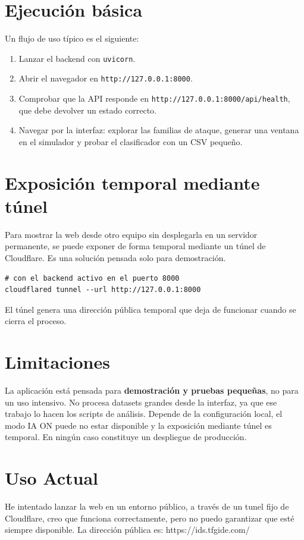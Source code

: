 \section{Ejecución básica}
\label{sec:apb_ejecucion}

Un flujo de uso típico es el siguiente:

\begin{enumerate}
  \item Lanzar el backend con \texttt{uvicorn}.
  \item Abrir el navegador en \texttt{http://127.0.0.1:8000}.
  \item Comprobar que la API responde en \texttt{http://127.0.0.1:8000/api/health}, que debe devolver un estado correcto.
  \item Navegar por la interfaz: explorar las familias de ataque, generar una ventana en el simulador y probar el clasificador con un CSV pequeño.
\end{enumerate}

\section{Exposición temporal mediante túnel}
\label{sec:apb_tunel}

Para mostrar la web desde otro equipo sin desplegarla en un servidor permanente, se puede exponer de forma temporal mediante un túnel de Cloudflare. Es una solución pensada solo para demostración.

\begin{small}
\begin{verbatim}
# con el backend activo en el puerto 8000
cloudflared tunnel --url http://127.0.0.1:8000
\end{verbatim}
\end{small}

El túnel genera una dirección pública temporal que deja de funcionar cuando se cierra el proceso.

\section{Limitaciones}
\label{sec:apb_limitaciones}

La aplicación está pensada para \textbf{demostración y pruebas pequeñas}, no para un uso intensivo. No procesa datasets grandes desde la interfaz, ya que ese trabajo lo hacen los scripts de análisis. Depende de la configuración local, el modo IA ON puede no estar disponible y la exposición mediante túnel es temporal. En ningún caso constituye un despliegue de producción.


\section{Uso Actual}

He intentado lanzar la web en un entorno público, a través de un tunel fijo de Cloudflare, creo que funciona correctamente, pero no puedo garantizar que esté siempre disponible. La dirección pública es:   https://ids.tfgide.com/